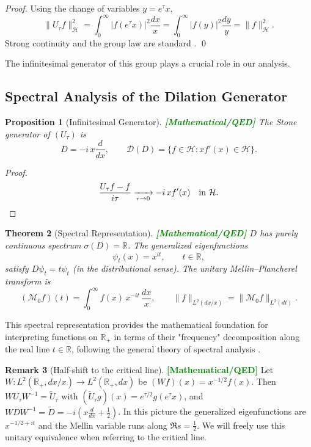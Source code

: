 \documentclass[12pt]{article}
\theoremstyle{plain}
\newtheorem{theorem}{Theorem}[section]
\newtheorem{proposition}[theorem]{Proposition}
\theoremstyle{definition}
\newtheorem{remark}[theorem]{Remark}
\newcommand{\statusmath}{\textcolor{green}{\textbf{[Mathematical/QED]}}}
\begin{document}
\begin{proof}
Using the change of variables $y=e^\tau x$,
$$
\|U_\tau f\|_{\mathcal{H}}^2=\int_0^\infty |f(e^\tau x)|^2\frac{dx}{x}
=\int_0^\infty |f(y)|^2\frac{dy}{y}=\|f\|_{\mathcal{H}}^2.
$$
Strong continuity and the group law are standard \cite{reed-simon1978}. \qed
\end{proof}

The infinitesimal generator of this group plays a crucial role in our analysis.

\subsection{Spectral Analysis of the Dilation Generator}

\begin{proposition}[Infinitesimal Generator] \statusmath
The Stone generator of $(U_\tau)$ is
$$
D=-i\,x\frac{d}{dx},\qquad \mathcal{D}(D)=\{f\in\mathcal{H}: x f'(x)\in\mathcal{H}\}.
$$
\end{proposition}

\begin{proof}
$$
\frac{U_\tau f-f}{i\tau}\xrightarrow[\tau\to0]{} -i\,x f'(x)
\quad\text{in } \mathcal{H}.
\qedhere
$$
\end{proof}

\begin{theorem}[Spectral Representation] \statusmath
$D$ has purely continuous spectrum $\sigma(D)=\mathbb{R}$. The generalized eigenfunctions
$$
\psi_t(x)=x^{it},\qquad t\in\mathbb{R},
$$
satisfy $D\psi_t=t\psi_t$ (in the distributional sense). The unitary Mellin–Plancherel transform is
$$
(\mathcal{M}_0 f)(t)=\int_0^\infty f(x)\,x^{-it}\,\frac{dx}{x},\qquad
\|f\|_{L^2(dx/x)}=\|\mathcal{M}_0 f\|_{L^2(dt)}.
$$
\end{theorem}

This spectral representation provides the mathematical foundation for interpreting functions on $\mathbb{R}_+$ in terms of their "frequency" decomposition along the real line $t \in \mathbb{R}$, following the general theory of spectral analysis \cite{kato1995}.

\begin{remark}[Half-shift to the critical line] \statusmath
Let $W:L^2(\mathbb{R}_+,dx/x)\to L^2(\mathbb{R}_+,dx)$ be $(Wf)(x)=x^{-1/2}f(x)$.
Then $W U_\tau W^{-1}=\widetilde U_\tau$ with $(\widetilde U_\tau g)(x)=e^{\tau/2}g(e^\tau x)$,
and $W D W^{-1}=\widetilde D=-i\left(x\frac{d}{dx}+\tfrac12\right)$. In this picture the
generalized eigenfunctions are $x^{-1/2+it}$ and the Mellin variable runs along $\Re s=\tfrac12$.
We will freely use this unitary equivalence when referring to the critical line.
\end{remark}
\end{document}
